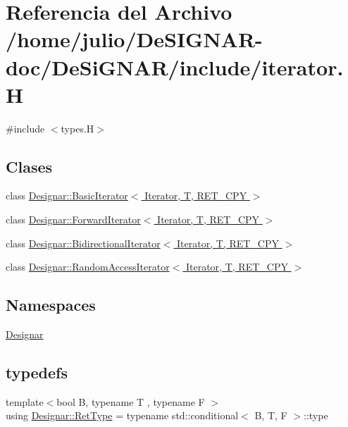 \hypertarget{iterator_8_h}{}\section{Referencia del Archivo /home/julio/\+De\+S\+I\+G\+N\+A\+R-\/doc/\+De\+Si\+G\+N\+A\+R/include/iterator.H}
\label{iterator_8_h}
{\ttfamily \#include $<$types.\+H$>$}\newline
\subsection*{Clases}
\begin{DoxyCompactItemize}
\item 
class \hyperlink{class_designar_1_1_basic_iterator}{Designar\+::\+Basic\+Iterator$<$ Iterator, T, R\+E\+T\+\_\+\+C\+P\+Y $>$}
\item 
class \hyperlink{class_designar_1_1_forward_iterator}{Designar\+::\+Forward\+Iterator$<$ Iterator, T, R\+E\+T\+\_\+\+C\+P\+Y $>$}
\item 
class \hyperlink{class_designar_1_1_bidirectional_iterator}{Designar\+::\+Bidirectional\+Iterator$<$ Iterator, T, R\+E\+T\+\_\+\+C\+P\+Y $>$}
\item 
class \hyperlink{class_designar_1_1_random_access_iterator}{Designar\+::\+Random\+Access\+Iterator$<$ Iterator, T, R\+E\+T\+\_\+\+C\+P\+Y $>$}
\end{DoxyCompactItemize}
\subsection*{Namespaces}
\begin{DoxyCompactItemize}
\item 
 \hyperlink{namespace_designar}{Designar}
\end{DoxyCompactItemize}
\subsection*{typedefs}
\begin{DoxyCompactItemize}
\item 
{\footnotesize template$<$bool B, typename T , typename F $>$ }\\using \hyperlink{namespace_designar_ab937f9c4bf5f1d0e65dbc616245d50ee}{Designar\+::\+Ret\+Type} = typename std\+::conditional$<$ B, T, F $>$\+::type
\end{DoxyCompactItemize}

